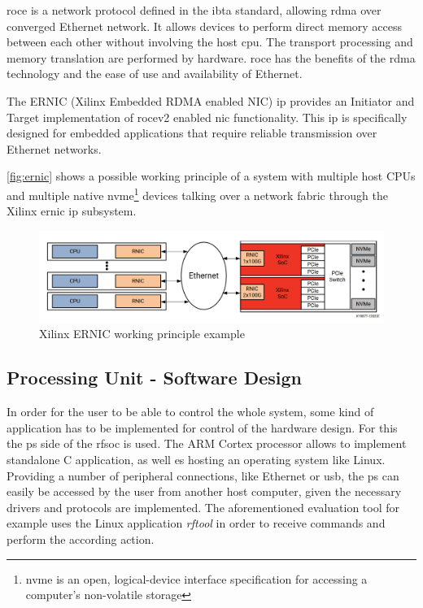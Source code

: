 \Gls{roce} is a network protocol defined in the \gls{ibta} standard, allowing \gls{rdma} over converged Ethernet network. 
It allows devices to perform direct memory access between each other without involving the host \gls{cpu}. 
The transport processing and memory translation are performed by hardware. 
\Gls{roce} has the benefits of the \gls{rdma} technology and the ease of use and availability of Ethernet.

The ERNIC (Xilinx Embedded RDMA enabled NIC) \gls{ip} provides an Initiator and Target  implementation of \gls{rocev2} enabled \gls{nic} functionality. This \gls{ip} is specifically designed for embedded applications that require reliable transmission over Ethernet networks.

\autoref{fig:ernic} shows a possible working principle of a system with multiple host CPUs and multiple native \gls{nvme}\footnote{ \gls{nvme} is an open, logical-device interface specification for accessing a computer's non-volatile storage} devices talking over a network fabric through the Xilinx \gls{ernic} \gls{ip}
subsystem. \cite{ernic}

\begin{figure}[H]
	\centering
	\includegraphics[width = \textwidth]{chap/05-readout/img/ernic}
	\caption{Xilinx ERNIC working principle example \cite{ernic}}
	\label{fig:ernic}
\end{figure}

\subsection{Processing Unit - Software Design}
In order for the user to be able to control the whole system, some kind of application has to be implemented for control of the hardware design.
For this the \gls{ps} side of the \gls{rfsoc} is used. 
The ARM Cortex processor allows to implement standalone C application, as well es hosting an operating system like Linux. 
Providing a number of peripheral connections, like Ethernet or \gls{usb}, the \gls{ps} can easily be accessed by the user from another host computer, given the necessary drivers and protocols are implemented. 
The aforementioned evaluation tool for example uses the Linux application \textit{rftool} in order to receive commands and perform the according action.

